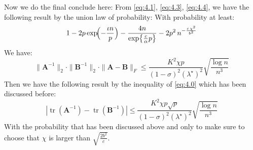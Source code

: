\documentclass{beamer}
\theoremstyle{remark}
\begin{document}
\begin{frame}
Now we do the final conclude here:
From \ref{eq:4.1}, \ref{eq:4.3}, \ref{eq:4.4}, we have the following result by the union law of probability:
With probability at least:
\[
  1 - 2p\exp\!\Bigl(-\frac{\iota n}{p}\Bigr) - \frac{4 n}{\exp\bigl\{\frac{c}{\alpha} p\bigr\}} - 2p^{2}\,n^{-\frac{c\,\chi^{2}}{b^{2}}}
\]
We have:
\[
  \|\mathbf{A}^{-1}\|_2 \cdot \|\mathbf{B}^{-1}\|_2 \cdot \|\mathbf{A}-\mathbf{B}\|_F \le \frac{K^{2}\chi p}{(1-\sigma)^{2}(\lambda^{\star})^{2}} \sqrt{\frac{\log n}{n^3}}
\]
Then we have the following result by the inequality of \ref{eq:4.0} which has been discussed before:
\[
  | \operatorname{tr}(\mathbf{A}^{-1}) - \operatorname{tr}(\mathbf{B}^{-1}) | \leq \frac{K^{2}\chi p\sqrt{p}}{(1-\sigma)^{2}(\lambda^{\star})^{2}} \sqrt{\frac{\log n}{n^3}}
\]
With the probability that has been discussed above and only to make sure to choose that $\chi$ is larger than $\sqrt{\frac{2 b^2}{c}}$.
\end{frame}
\end{document}

